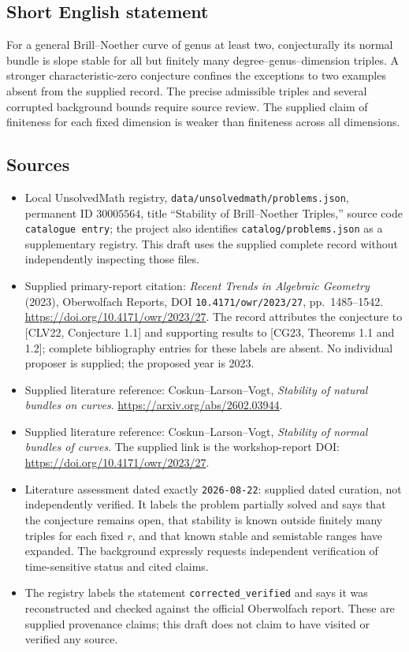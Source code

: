 \documentclass[11pt]{article}
\begin{document}
\subsection{Short English statement}
For a general Brill--Noether curve of genus at least two, conjecturally its normal bundle is slope stable for all but finitely many degree--genus--dimension triples. A stronger characteristic-zero conjecture confines the exceptions to two examples absent from the supplied record. The precise admissible triples and several corrupted background bounds require source review. The supplied claim of finiteness for each fixed dimension is weaker than finiteness across all dimensions.
\subsection{Sources}
\begin{itemize}
\item Local UnsolvedMath registry, \texttt{data/unsolvedmath/problems.json}, permanent ID \(30005564\), title ``Stability of Brill--Noether Triples,'' source code \texttt{catalogue entry}; the project also identifies \texttt{catalog/problems.json} as a supplementary registry. This draft uses the supplied complete record without independently inspecting those files.
\item Supplied primary-report citation: \emph{Recent Trends in Algebraic Geometry} (2023), Oberwolfach Reports, DOI \texttt{10.4171/owr/2023/27}, pp.\ 1485--1542. \url{https://doi.org/10.4171/owr/2023/27}. The record attributes the conjecture to [CLV22, Conjecture 1.1] and supporting results to [CG23, Theorems 1.1 and 1.2]; complete bibliography entries for these labels are absent. No individual proposer is supplied; the proposed year is 2023.
\item Supplied literature reference: Coskun--Larson--Vogt, \emph{Stability of natural bundles on curves}. \url{https://arxiv.org/abs/2602.03944}.
\item Supplied literature reference: Coskun--Larson--Vogt, \emph{Stability of normal bundles of curves}. The supplied link is the workshop-report DOI: \url{https://doi.org/10.4171/owr/2023/27}.
\item Literature assessment dated exactly \texttt{2026-08-22}: supplied dated curation, not independently verified. It labels the problem partially solved and says that the conjecture remains open, that stability is known outside finitely many triples for each fixed \(r\), and that known stable and semistable ranges have expanded. The background expressly requests independent verification of time-sensitive status and cited claims.
\item The registry labels the statement \texttt{corrected\_verified} and says it was reconstructed and checked against the official Oberwolfach report. These are supplied provenance claims; this draft does not claim to have visited or verified any source.
\end{itemize}
\end{document}
